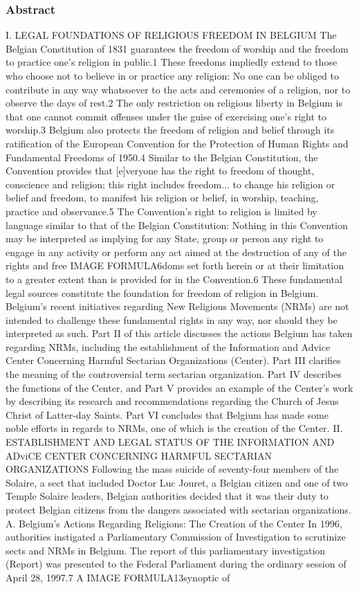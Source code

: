 \subsubsection*{Abstract}
I. LEGAL FOUNDATIONS OF RELIGIOUS FREEDOM IN BELGIUM The Belgian Constitution of 1831 guarantees the freedom of worship and the freedom to practice one's religion in public.1 These freedoms impliedly extend to those who choose not to believe in or practice any religion: No one can be obliged to contribute in any way whatsoever to the acts and ceremonies of a religion, nor to observe the days of rest.2 The only restriction on religious liberty in Belgium is that one cannot commit offenses under the guise of exercising one's right to worship.3 Belgium also protects the freedom of religion and belief through its ratification of the European Convention for the Protection of Human Rights and Fundamental Freedoms of 1950.4 Similar to the Belgian Constitution, the Convention provides that [e]veryone has the right to freedom of thought, conscience and religion; this right includes freedom... to change his religion or belief and freedom, to manifest his religion or belief, in worship, teaching, practice and observance.5 The Convention's right to religion is limited by language similar to that of the Belgian Constitution: Nothing in this Convention may be interpreted as implying for any State, group or person any right to engage in any activity or perform any act aimed at the destruction of any of the rights and free IMAGE FORMULA6doms set forth herein or at their limitation to a greater extent than is provided for in the Convention.6 These fundamental legal sources constitute the foundation for freedom of religion in Belgium. Belgium's recent initiatives regarding New Religious Movements (NRMs) are not intended to challenge these fundamental rights in any way, nor should they be interpreted as such. Part II of this article discusses the actions Belgium has taken regarding NRMs, including the establishment of the Information and Advice Center Concerning Harmful Sectarian Organizations (Center). Part III clarifies the meaning of the controversial term sectarian organization. Part IV describes the functions of the Center, and Part V provides an example of the Center's work by describing its research and recommendations regarding the Church of Jesus Christ of Latter-day Saints. Part VI concludes that Belgium has made some noble efforts in regards to NRMs, one of which is the creation of the Center. II. ESTABLISHMENT AND LEGAL STATUS OF THE INFORMATION AND ADviCE CENTER CONCERNING HARMFUL SECTARIAN ORGANIZATIONS Following the mass suicide of seventy-four members of the Solaire, a sect that included Doctor Luc Jouret, a Belgian citizen and one of two Temple Solaire leaders, Belgian authorities decided that it was their duty to protect Belgian citizens from the dangers associated with sectarian organizations. A. Belgium's Actions Regarding Religions: The Creation of the Center In 1996, authorities instigated a Parliamentary Commission of Investigation to scrutinize sects and NRMs in Belgium. The report of this parliamentary investigation (Report) was presented to the Federal Parliament during the ordinary session of April 28, 1997.7 A IMAGE FORMULA13synoptic of 